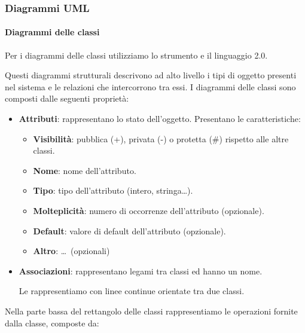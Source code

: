 		\subsubsection{Diagrammi UML}\label{PP:Sviluppo:UML}

		\paragraph{Diagrammi delle classi}\label{PP:Sviluppo:DiagrammiClassi}
		Per i diagrammi delle classi utilizziamo lo strumento  e il linguaggio  2.0.\par
        Questi diagrammi strutturali descrivono ad alto livello i tipi di oggetto presenti nel sistema e le relazioni che intercorrono tra essi.
		I diagrammi delle classi sono composti dalle seguenti proprietà:
		\begin{itemize}
			\item \textbf{Attributi}: rappresentano lo stato dell'oggetto. Presentano le caratteristiche:
			    \begin{itemize}
			        \item \textbf{Visibilità}: pubblica (+), privata (-) o protetta (\#) rispetto alle altre classi.
			        \item \textbf{Nome}: nome dell'attributo.
			        \item \textbf{Tipo}: tipo dell'attributo (intero, stringa\dots).
			        \item \textbf{Molteplicità}: numero di occorrenze dell'attributo (opzionale).
			        \item \textbf{Default}: valore di default dell'attributo (opzionale).
                    \item \textbf{Altro}: \dots~(opzionali)
			    \end{itemize}
			\item \textbf{Associazioni}: rappresentano legami tra classi ed hanno un nome.\par
                        Le rappresentiamo con linee continue orientate tra due classi.
		\end{itemize}
        Nella parte bassa del rettangolo delle classi rappresentiamo le operazioni fornite dalla classe, composte da:
